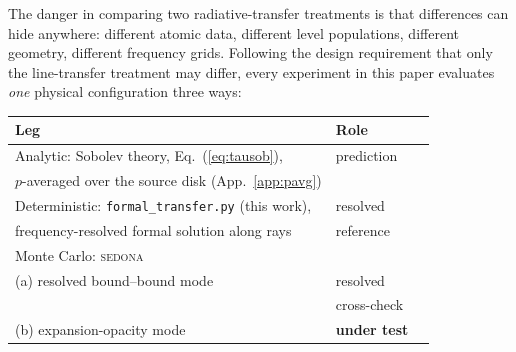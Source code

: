 \documentclass[fleqn,usenatbib]{mnras}
\begin{document}
The danger in comparing two radiative-transfer treatments is that
differences can hide anywhere: different atomic data, different level
populations, different geometry, different frequency grids. Following the
design requirement that only the line-transfer treatment may differ, every
experiment in this paper evaluates \emph{one} physical configuration three
ways:

\begin{table}
\centering
\small
\begin{tabular}{@{}lll@{}}
\toprule
Leg & Role \\
\midrule
Analytic: Sobolev theory, Eq.~(\ref{eq:tausob}), & prediction \\
$p$-averaged over the source disk (App.~\ref{app:pavg}) & \\[2pt]
Deterministic: \texttt{formal\_transfer.py} (this work), & resolved \\
frequency-resolved formal solution along rays & reference \\[2pt]
Monte Carlo: \textsc{sedona} \citep{sedona,rothkasen2015} & \\
\quad (a) resolved bound--bound mode & resolved \\
 & cross-check \\
\quad (b) expansion-opacity mode & \textbf{under test} \\
\bottomrule
\end{tabular}
\end{table}
\end{document}
